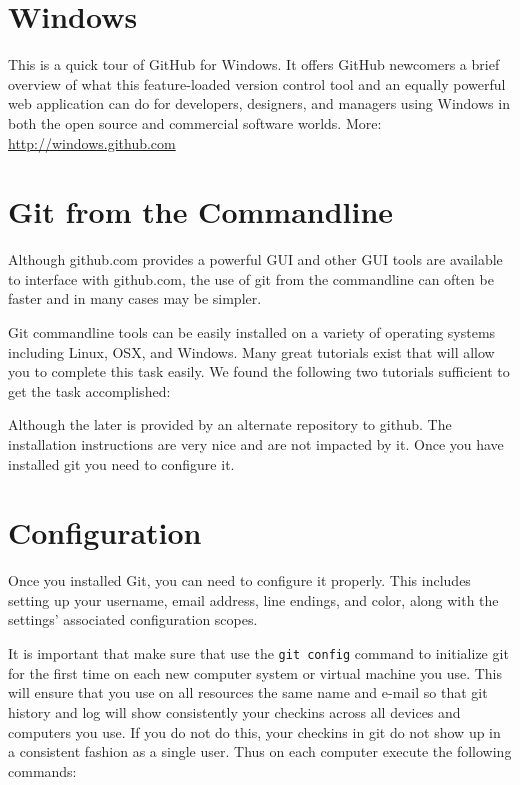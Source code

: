 \section{Windows}\label{windows}

This is a quick tour of GitHub for Windows. It offers GitHub newcomers a
brief overview of what this feature-loaded version control tool and an
equally powerful web application can do for developers, designers, and
managers using Windows in both the open source and commercial software
worlds. More: \url{http://windows.github.com}



\section{Git from the Commandline}\label{s:git-commands}

Although github.com provides a powerful GUI and other GUI tools are
available to interface with github.com, the use of git from the
commandline can often be faster and in many cases may be simpler. 

Git commandline tools can be easily installed on a variety of
operating systems including Linux, OSX, and Windows. Many great
tutorials exist that will allow you to complete this task easily. We
found the following two tutorials sufficient to get the task
accomplished:



Although the later is provided by an alternate repository to
github. The installation instructions are very nice and are not
impacted by it. Once you have installed git you need to configure it.

\section{Configuration}\label{config}

Once you installed Git, you can need to configure it properly.  This
includes setting up your username, email address, line endings, and
color, along with the settings' associated configuration scopes.


It is important that make sure that use the \verb|git config| command
to initialize git for the first time on each new computer system or
virtual machine you use. This will ensure that you use on all
resources the same name and e-mail so that git history and log will
show consistently your checkins across all devices and computers you
use.  If you do not do this, your checkins in git do not show up in a
consistent fashion as a single user. Thus on each computer execute the
following commands:

